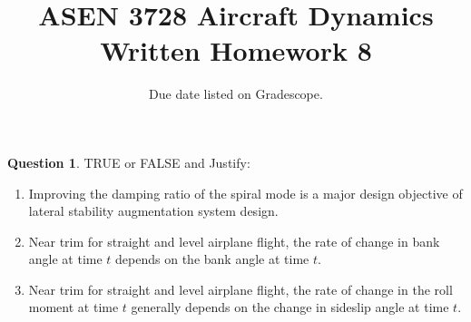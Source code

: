 \documentclass{article}
\title{ASEN 3728 Aircraft Dynamics\\Written Homework 8}
\date{Due date listed on Gradescope.}
\theoremstyle{definition}
\newtheorem{question}{Question}
\begin{document}
\maketitle

\begin{question}
    TRUE or FALSE and Justify:
    \begin{enumerate}[label=\alph*)]
        \item Improving the damping ratio of the spiral mode is a major design objective of lateral stability augmentation system design.

        \item Near trim for straight and level airplane flight, the rate of change in bank angle at time $t$ depends on the bank angle at time $t$.

        \item Near trim for straight and level airplane flight, the rate of change in the roll moment at time $t$ generally depends on the change in sideslip angle at time $t$.
    \end{enumerate}
\end{question}

\clearpage
\end{document}
